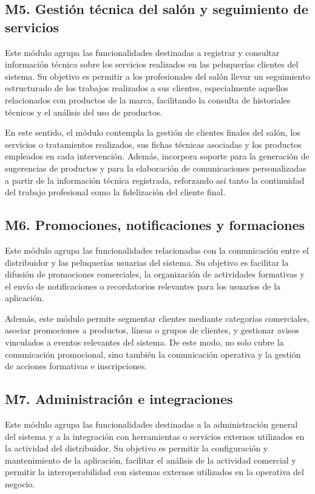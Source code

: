 \subsection{M5. Gestión técnica del salón y seguimiento de servicios}

Este módulo agrupa las funcionalidades destinadas a registrar y consultar información técnica sobre los servicios realizados en las peluquerías clientes del sistema. Su objetivo es permitir a los profesionales del salón llevar un seguimiento estructurado de los trabajos realizados a sus clientes, especialmente aquellos relacionados con productos de la marca, facilitando la consulta de historiales técnicos y el análisis del uso de productos.

En este sentido, el módulo contempla la gestión de clientes finales del salón, los servicios o tratamientos realizados, sus fichas técnicas asociadas y los productos empleados en cada intervención. Además, incorpora soporte para la generación de sugerencias de productos y para la elaboración de comunicaciones personalizadas a partir de la información técnica registrada, reforzando así tanto la continuidad del trabajo profesional como la fidelización del cliente final.

\subsection{M6. Promociones, notificaciones y formaciones}

Este módulo agrupa las funcionalidades relacionadas con la comunicación entre el distribuidor y las peluquerías usuarias del sistema. Su objetivo es facilitar la difusión de promociones comerciales, la organización de actividades formativas y el envío de notificaciones o recordatorios relevantes para los usuarios de la aplicación.

Además, este módulo permite segmentar clientes mediante categorías comerciales, asociar promociones a productos, líneas o grupos de clientes, y gestionar avisos vinculados a eventos relevantes del sistema. De este modo, no solo cubre la comunicación promocional, sino también la comunicación operativa y la gestión de acciones formativas e inscripciones.

\subsection{M7. Administración e integraciones}

Este módulo agrupa las funcionalidades destinadas a la administración general del sistema y a la integración con herramientas o servicios externos utilizados en la actividad del distribuidor. Su objetivo es permitir la configuración y mantenimiento de la aplicación, facilitar el análisis de la actividad comercial y permitir la interoperabilidad con sistemas externos utilizados en la operativa del negocio.

